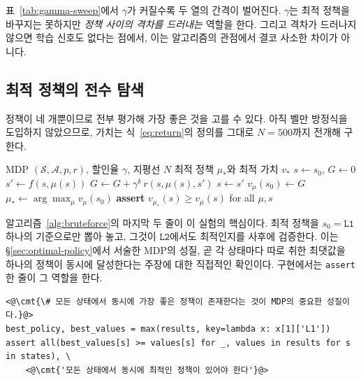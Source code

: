 \documentclass[11pt,a4paper]{article}
\newcommand{\Sset}{\mathcal{S}}
\newcommand{\Aset}{\mathcal{A}}
\newcommand{\cmt}[1]{\textcolor{codecm}{#1}}   %
\begin{document}
표~\ref{tab:gamma-sweep}에서 $\gamma$가 커질수록 두 열의 간격이 벌어진다. $\gamma$는 최적 정책을 바꾸지는
못하지만 \emph{정책 사이의 격차를 드러내는} 역할을 한다. 그리고 격차가 드러나지 않으면 학습 신호도
없다는 점에서, 이는 알고리즘의 관점에서 결코 사소한 차이가 아니다.

\subsection{최적 정책의 전수 탐색}

정책이 네 개뿐이므로 전부 평가해 가장 좋은 것을 고를 수 있다. 아직 벨만 방정식을 도입하지 않았으므로,
가치는 식~\eqref{eq:return}의 정의를 그대로 $N=500$까지 전개해 구한다.

\begin{algorithm}[htbp]
\caption{결정적 정책의 전수 탐색}
\label{alg:bruteforce}
\begin{algorithmic}[1]
\Require MDP $(\Sset,\Aset,p,r)$, 할인율 $\gamma$, 지평선 $N$
\Ensure 최적 정책 $\mu_*$와 최적 가치 $v_*$
\ForAll{$\mu \in \Aset^{\Sset}$} \Comment{결정적 정책 $|\Aset|^{|\Sset|}$가지}
  \ForAll{$s_0 \in \Sset$}
    \State $s \gets s_0$, \; $G \gets 0$
      \State $s' \gets f(s, \mu(s))$
      \State $G \gets G + \gamma^{k}\, r(s, \mu(s), s')$ 
      \State $s \gets s'$
    \EndFor
    \State $v_\mu(s_0) \gets G$
  \EndFor
\EndFor
\State $\mu_* \gets \arg\max_\mu v_\mu(s_0)$ 
\State \textbf{assert} $v_{\mu_*}(s) \ge v_\mu(s)$ for all $\mu, s$ 
\end{algorithmic}
\end{algorithm}

알고리즘~\ref{alg:bruteforce}의 마지막 두 줄이 이 실험의 핵심이다. 최적 정책을 $s_0=\texttt{L1}$ 하나의
기준으로만 뽑아 놓고, 그것이 $\texttt{L2}$에서도 최적인지를 사후에 검증한다. 이는
\S\ref{sec:optimal-policy}에서 서술한
MDP의 성질, 곧 각 상태마다 따로 취한 최댓값을 하나의 정책이 동시에 달성한다는 주장에 대한 직접적인
확인이다. 구현에서는 \texttt{assert} 한 줄이 그 역할을 한다.

\begin{lstlisting}[caption={동시 최적성의 검증 (\texttt{s03\_policy\_bruteforce.py})},label={lst:assert}]
<@\cmt{\# 모든 상태에서 동시에 가장 좋은 정책이 존재한다는 것이 MDP의 중요한 성질이다.}@>
best_policy, best_values = max(results, key=lambda x: x[1]['L1'])
assert all(best_values[s] >= values[s] for _, values in results for s in states), \
    <@\cmt{'모든 상태에서 동시에 최적인 정책이 있어야 한다'}@>
\end{lstlisting}
\end{document}
